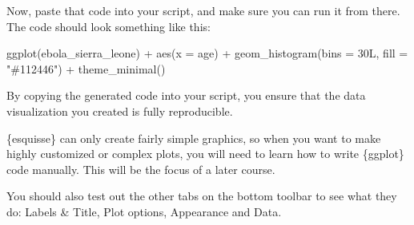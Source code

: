 \documentclass[
  letterpaper,
  DIV=11,
  numbers=noendperiod]{scrreprt}
\newenvironment{Shaded}{\begin{snugshade}}{\end{snugshade}}
\newcommand{\AttributeTok}[1]{\textcolor[rgb]{0.40,0.45,0.13}{#1}}
\newcommand{\FunctionTok}[1]{\textcolor[rgb]{0.28,0.35,0.67}{#1}}
\newcommand{\NormalTok}[1]{\textcolor[rgb]{0.00,0.23,0.31}{#1}}
\newcommand{\SpecialCharTok}[1]{\textcolor[rgb]{0.37,0.37,0.37}{#1}}
\newcommand{\StringTok}[1]{\textcolor[rgb]{0.13,0.47,0.30}{#1}}
\begin{document}
Now, paste that code into your script, and make sure you can run it from
there. The code should look something like this:

\begin{Shaded}
\begin{Highlighting}[]
\FunctionTok{ggplot}\NormalTok{(ebola\_sierra\_leone) }\SpecialCharTok{+}
  \FunctionTok{aes}\NormalTok{(}\AttributeTok{x =}\NormalTok{ age) }\SpecialCharTok{+}
  \FunctionTok{geom\_histogram}\NormalTok{(}\AttributeTok{bins =}\NormalTok{ 30L, }\AttributeTok{fill =} \StringTok{"\#112446"}\NormalTok{) }\SpecialCharTok{+}
  \FunctionTok{theme\_minimal}\NormalTok{()}
\end{Highlighting}
\end{Shaded}

By copying the generated code into your script, you ensure that the data
visualization you created is fully reproducible.

\begin{tcolorbox}[enhanced jigsaw, colframe=quarto-callout-note-color-frame, rightrule=.15mm, opacityback=0, breakable, coltitle=black, colbacktitle=quarto-callout-note-color!10!white, bottomrule=.15mm, leftrule=.75mm, toprule=.15mm, arc=.35mm, bottomtitle=1mm, colback=white, left=2mm, opacitybacktitle=0.6, titlerule=0mm, title=\textcolor{quarto-callout-note-color}{\faInfo}\hspace{0.5em}{Pro Tip}, toptitle=1mm]

\{esquisse\} can only create fairly simple graphics, so when you want to
make highly customized or complex plots, you will need to learn how to
write \{ggplot\} code manually. This will be the focus of a later
course.

\end{tcolorbox}

You should also test out the other tabs on the bottom toolbar to see
what they do: Labels \& Title, Plot options, Appearance and Data.
\end{document}

